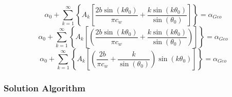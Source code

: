 \documentclass[a4paper, 12pt]{report}
\begin{document}
\begin{center}
$$\alpha_{0} + \sum^{\infty}_{k = 1}\left\{A_{k}\left[\frac{2b\sin(k\theta_{0})}{\pi c_{w}} + \frac{k\sin(k\theta_{0})}{\sin(\theta_{0})}\right]\right\} = \alpha_{Geo}$$
$$\alpha_{0} + \sum^{\infty}_{k = 1}\left\{A_{k}\left[\left(\frac{2b\sin(k\theta_{0})}{\pi c_{w}} + \frac{k\sin(k\theta_{0})}{\sin(\theta_{0})}\right)\right]\right\} = \alpha_{Geo}$$
\begin{equation}
\alpha_{0} + \sum^{\infty}_{k = 1}\left\{A_{k}\left[\left(\frac{2b}{\pi c_{w}} + \frac{k}{\sin(\theta_{0})}\right)\sin(k\theta_{0})\right]\right\} = \alpha_{Geo}
\label{System of Equations Lifting Line Theory General}
\end{equation}


\subsubsection{Solution Algorithm}
\begin{comment}
\end{comment}



\end{center}
\end{document}
